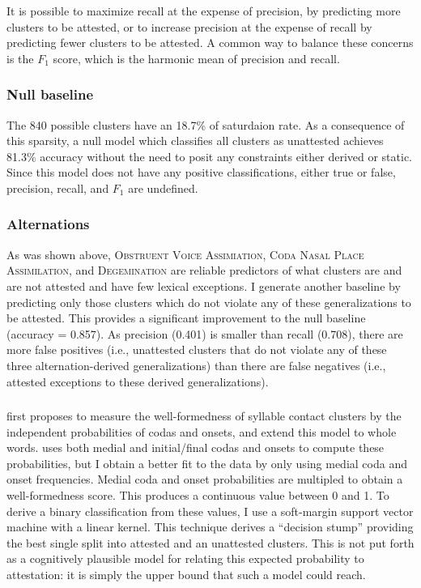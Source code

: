 It is possible to maximize recall at the expense of precision, by predicting more clusters to be attested, or to increase precision at the expense of recall by predicting fewer clusters to be attested. A common way to balance these concerns is the $F_1$ score, which is the harmonic mean of precision and recall.

\subsubsection{Null baseline}

The 840 possible clusters have an 18.7\% of saturdaion rate. As a consequence of this sparsity, a null model which classifies all clusters as unattested achieves 81.3\% accuracy without the need to posit any constraints either derived or static. Since this model does not have any positive classifications, either true or false, precision, recall, and $F_1$ are undefined.

\subsubsection{Alternations}

As was shown above, \textsc{Obstruent Voice Assimiation}, \textsc{Coda Nasal Place Assimilation}, and \textsc{Degemination} are reliable predictors of what clusters are and are not attested and have few lexical exceptions. I generate another baseline by predicting only those clusters which do not violate any of these generalizations to be attested. This provides a significant improvement to the null baseline (accuracy = 0.857). As precision (0.401) is smaller than recall (0.708), there are more false positives (i.e., unattested clusters that do not violate any of these three alternation-derived generalizations) than there are false negatives (i.e., attested exceptions to these derived generalizations). 

\subsubsection{\citet{Pierrehumbert1994}}

\citet{Pierrehumbert1994} first proposes to measure the well-formedness of syllable contact clusters by the independent probabilities of codas and onsets, and \citet{Coleman1997} extend this model to whole words. \citet{Pierrehumbert1994} uses both medial and initial/final codas and onsets to compute these probabilities, but I obtain a better fit to the data by only using medial coda and onset frequencies. Medial coda and onset probabilities are multipled to obtain a well-formedness score. This produces a continuous value between 0 and 1. To derive a binary classification from these values, I use a soft-margin support vector machine \citep{Cortes1995} with a linear kernel. This technique derives a ``decision stump'' providing the best single split into attested and an unattested clusters. This is not put forth as a cognitively plausible model for relating this expected probability to attestation: it is simply the upper bound that such a model could reach. 


